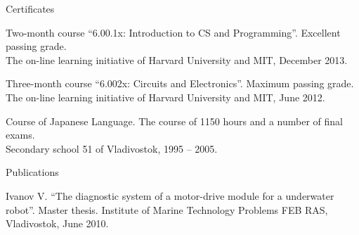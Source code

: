 \documentclass{template}
\begin{document}
\begin{rSection}{Certificates}

\begin{rItemize}
\item Two-month course \textquotedblleft 6.00.1x: Introduction to CS and Programming\textquotedblright. Excellent passing grade. \\
The on-line learning initiative of Harvard University and MIT, December 2013.
\item Three-month course \textquotedblleft 6.002x: Circuits and Electronics\textquotedblright. Maximum passing grade. \\
The on-line learning initiative of Harvard University and MIT, June 2012.
\item Course of Japanese Language. The course of 1150 hours and a number of final exams. \\
Secondary school 51 of Vladivostok, 1995 -- 2005.
\end{rItemize}

\end{rSection}


\begin{rSection}{Publications}

\begin{rItemize}
\item Ivanov V. \textquotedblleft The diagnostic system of a motor-drive module for a underwater robot\textquotedblright. Master thesis. Institute of Marine Technology Problems FEB RAS, Vladivostok, June 2010.
\end{rItemize}

\end{rSection}

\end{document}
